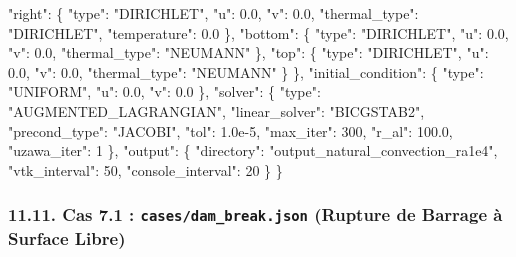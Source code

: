 \documentclass[
  french,
]{article}
\newenvironment{Shaded}{}{}
\newcommand{\DataTypeTok}[1]{\textcolor[rgb]{0.56,0.13,0.00}{#1}}
\newcommand{\DecValTok}[1]{\textcolor[rgb]{0.25,0.63,0.44}{#1}}
\newcommand{\FloatTok}[1]{\textcolor[rgb]{0.25,0.63,0.44}{#1}}
\newcommand{\FunctionTok}[1]{\textcolor[rgb]{0.02,0.16,0.49}{#1}}
\newcommand{\StringTok}[1]{\textcolor[rgb]{0.25,0.44,0.63}{#1}}
\begin{document}
\begin{Shaded}
\begin{Highlighting}[]
    \DataTypeTok{"right"}\FunctionTok{:}  \FunctionTok{\{} \DataTypeTok{"type"}\FunctionTok{:} \StringTok{"DIRICHLET"}\FunctionTok{,} \DataTypeTok{"u"}\FunctionTok{:} \FloatTok{0.0}\FunctionTok{,} \DataTypeTok{"v"}\FunctionTok{:} \FloatTok{0.0}\FunctionTok{,} \DataTypeTok{"thermal\_type"}\FunctionTok{:} \StringTok{"DIRICHLET"}\FunctionTok{,} \DataTypeTok{"temperature"}\FunctionTok{:} \FloatTok{0.0} \FunctionTok{\},}
    \DataTypeTok{"bottom"}\FunctionTok{:} \FunctionTok{\{} \DataTypeTok{"type"}\FunctionTok{:} \StringTok{"DIRICHLET"}\FunctionTok{,} \DataTypeTok{"u"}\FunctionTok{:} \FloatTok{0.0}\FunctionTok{,} \DataTypeTok{"v"}\FunctionTok{:} \FloatTok{0.0}\FunctionTok{,} \DataTypeTok{"thermal\_type"}\FunctionTok{:} \StringTok{"NEUMANN"} \FunctionTok{\},}
    \DataTypeTok{"top"}\FunctionTok{:}    \FunctionTok{\{} \DataTypeTok{"type"}\FunctionTok{:} \StringTok{"DIRICHLET"}\FunctionTok{,} \DataTypeTok{"u"}\FunctionTok{:} \FloatTok{0.0}\FunctionTok{,} \DataTypeTok{"v"}\FunctionTok{:} \FloatTok{0.0}\FunctionTok{,} \DataTypeTok{"thermal\_type"}\FunctionTok{:} \StringTok{"NEUMANN"} \FunctionTok{\}}
  \FunctionTok{\},}
  \DataTypeTok{"initial\_condition"}\FunctionTok{:} \FunctionTok{\{} \DataTypeTok{"type"}\FunctionTok{:} \StringTok{"UNIFORM"}\FunctionTok{,} \DataTypeTok{"u"}\FunctionTok{:} \FloatTok{0.0}\FunctionTok{,} \DataTypeTok{"v"}\FunctionTok{:} \FloatTok{0.0} \FunctionTok{\},}
  \DataTypeTok{"solver"}\FunctionTok{:} \FunctionTok{\{}
    \DataTypeTok{"type"}\FunctionTok{:} \StringTok{"AUGMENTED\_LAGRANGIAN"}\FunctionTok{,}
    \DataTypeTok{"linear\_solver"}\FunctionTok{:} \StringTok{"BICGSTAB2"}\FunctionTok{,}
    \DataTypeTok{"precond\_type"}\FunctionTok{:} \StringTok{"JACOBI"}\FunctionTok{,}
    \DataTypeTok{"tol"}\FunctionTok{:} \FloatTok{1.0e{-}5}\FunctionTok{,} \DataTypeTok{"max\_iter"}\FunctionTok{:} \DecValTok{300}\FunctionTok{,} \DataTypeTok{"r\_al"}\FunctionTok{:} \FloatTok{100.0}\FunctionTok{,} \DataTypeTok{"uzawa\_iter"}\FunctionTok{:} \DecValTok{1}
  \FunctionTok{\},}
  \DataTypeTok{"output"}\FunctionTok{:} \FunctionTok{\{} \DataTypeTok{"directory"}\FunctionTok{:} \StringTok{"output\_natural\_convection\_ra1e4"}\FunctionTok{,} \DataTypeTok{"vtk\_interval"}\FunctionTok{:} \DecValTok{50}\FunctionTok{,} \DataTypeTok{"console\_interval"}\FunctionTok{:} \DecValTok{20} \FunctionTok{\}}
\FunctionTok{\}}
\end{Highlighting}
\end{Shaded}

\subsubsection{\texorpdfstring{11.11. Cas 7.1 :
\texttt{cases/dam\_break.json} (Rupture de Barrage à Surface
Libre)}{11.11. Cas 7.1 : cases/dam\_break.json (Rupture de Barrage à Surface Libre)}}\label{cas-7.1-casesdam_break.json-rupture-de-barrage-uxe0-surface-libre}
\end{document}
